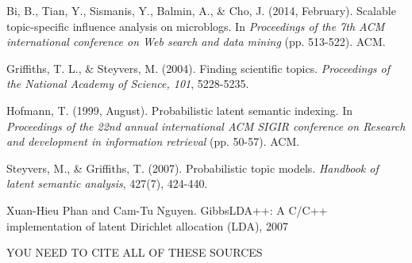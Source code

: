 \documentclass[a4paper]{article}
\begin{document}

\begin{thebibliography}{9}
Bi, B., Tian, Y., Sismanis, Y., Balmin, A., \& Cho, J. (2014, February). Scalable topic-specific influence analysis on microblogs. In \textit{Proceedings of the 7th ACM international conference on Web search and data mining} (pp. 513-522). ACM.

Griffiths, T. L., \& Steyvers, M. (2004). Finding scientific topics. \textit{Proceedings of the National Academy of Science, 101}, 5228-5235.

Hofmann, T. (1999, August). Probabilistic latent semantic indexing. In \textit{Proceedings of the 22nd annual international ACM SIGIR conference on Research and development in information retrieval} (pp. 50-57). ACM.

Steyvers, M., \& Griffiths, T. (2007). Probabilistic topic models. \textit{Handbook of latent semantic analysis}, 427(7), 424-440.

Xuan-Hieu Phan and Cam-Tu Nguyen. GibbsLDA++: A C/C++ implementation of latent Dirichlet allocation (LDA), 2007

YOU NEED TO CITE ALL OF THESE SOURCES

\end{thebibliography}
\end{document}
